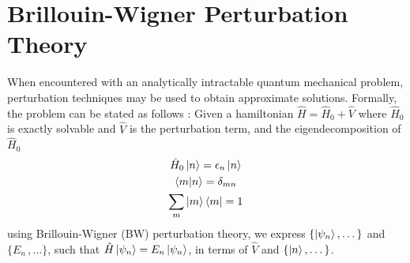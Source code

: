 %

\chapter{Brillouin-Wigner Perturbation Theory} \label{ch:bw}
When encountered with an analytically intractable quantum mechanical problem, perturbation techniques 
may be used to obtain approximate solutions. Formally, the problem can be stated as follows : 
Given a hamiltonian $\hat{H} = \hat{H}_{0} + \hat{V}$ where $\hat{H}_{0}$ is exactly solvable and 
$\hat{V}$ is the perturbation term, and the eigendecomposition of $\hat{H}_{0}\quad$ \textemdash 
\begin{gather*}
  \hat{H}_{0}\ket{n} = \epsilon_{n}\ket{n} \\
  \braket{m|n} = \delta_{mn} \\
  \sum_{m} {\ket{m} \bra{m}} = \mathrm{1}
\end{gather*}
using Brillouin-Wigner (BW) perturbation theory, we express $\{\ket{\psi_n},\dots\}$ and $\{E_n\,,\dots\}$, such that $\hat{H}\ket{\psi_n} = E_n\ket{\psi_n}$, in terms of
$\hat{V}$ and $\{\ket{n},\dots\}$.

